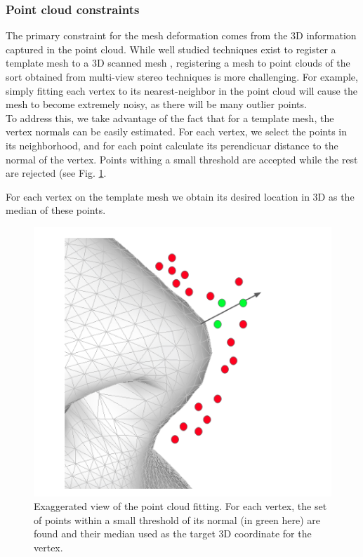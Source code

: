 \documentclass[10pt,twocolumn,letterpaper]{article}
\begin{document}
 
 \subsubsection{Point cloud constraints}
 The primary constraint for the mesh deformation comes from the 3D information captured in the point cloud.
 While well studied techniques exist to register a template mesh to a 3D scanned mesh \cite{amberg2007optimal}, registering a mesh to point clouds of the sort obtained from multi-view stereo techniques is more challenging. For example, simply fitting each vertex to its nearest-neighbor in the point cloud will cause the mesh to become extremely noisy, as there will be many outlier points. \\
 
To address this, we take advantage of the fact that for a template mesh, the vertex normals can be easily estimated. For each vertex, we select the points in its neighborhood, and for each point calculate its perendicuar distance to the normal of the vertex. Points withing a small threshold are accepted while the rest are rejected (see Fig. \ref{fig:mesh_fit_pcl}. 
 
 For each vertex on the template mesh we obtain its desired location in 3D as the median of these points. \\
 
\begin{figure}[t]
\begin{center}
   \includegraphics[width=0.8\linewidth]{images/mesh_fit_pcl.png}
\end{center}
   \caption{Exaggerated view of the point cloud fitting. For each vertex, the set of points within a small threshold of its normal (in green here) are found and their median used as the target 3D coordinate for the vertex. }
\label{fig:mesh_fit_pcl}
\end{figure}
\end{document}
